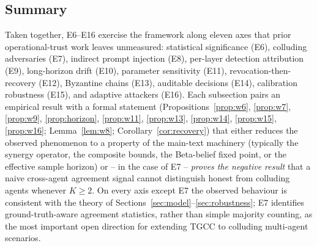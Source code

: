 \documentclass[sigconf,anonymous]{acmart}
\theoremstyle{plain}
\theoremstyle{definition}
\theoremstyle{remark}
\begin{document}
\subsection{Summary}
\label{app:ext_summary}
Taken together, E6--E16 exercise the framework along eleven axes that
prior operational-trust work leaves unmeasured: statistical
significance (E6), colluding adversaries (E7), indirect prompt
injection (E8), per-layer detection attribution (E9), long-horizon
drift (E10), parameter sensitivity (E11), revocation-then-recovery
(E12), Byzantine chains (E13), auditable decisions (E14), calibration
robustness (E15), and adaptive attackers (E16).  Each subsection pairs
an empirical result with a formal statement
(Propositions~\ref{prop:w6}, \ref{prop:w7}, \ref{prop:w9},
\ref{prop:horizon}, \ref{prop:w11}, \ref{prop:w13}, \ref{prop:w14},
\ref{prop:w15}, \ref{prop:w16}; Lemma~\ref{lem:w8};
Corollary~\ref{cor:recovery}) that either reduces the observed
phenomenon to a property of the main-text machinery (typically the
synergy operator, the composite bounds, the Beta-belief fixed point, or
the effective sample horizon) or -- in the case of E7 -- \emph{proves
the negative result} that a naive cross-agent agreement signal cannot
distinguish honest from colluding agents whenever $K\ge 2$.  On every
axis except E7 the observed behaviour is consistent with the theory of
Sections~\ref{sec:model}--\ref{sec:robustness}; E7 identifies
ground-truth-aware agreement statistics, rather than simple majority
counting, as the most important open direction for extending TGCC to
colluding multi-agent scenarios.
\end{document}

